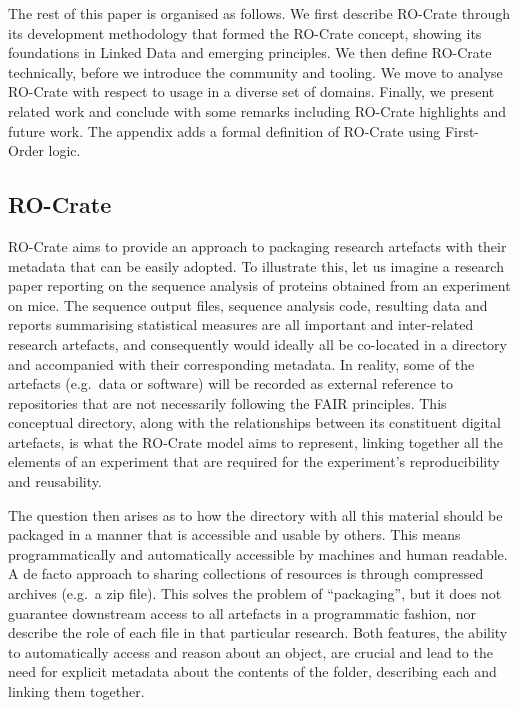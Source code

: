 The rest of this paper is organised as follows. We first describe
RO-Crate through its development methodology that formed the RO-Crate
concept, showing its foundations in Linked Data and emerging principles.
We then define RO-Crate technically, before we introduce the community
and tooling. We move to analyse RO-Crate with respect to usage in a
diverse set of domains. Finally, we present related work and conclude
with some remarks including RO-Crate highlights and future work. The
appendix adds a formal definition of RO-Crate using First-Order logic.

\hypertarget{rocrate}{%
\subsection{RO-Crate}\label{rocrate}}

RO-Crate aims to provide an approach to packaging research artefacts
with their metadata that can be easily adopted. To illustrate this, let
us imagine a research paper reporting on the sequence analysis of
proteins obtained from an experiment on mice. The sequence output files,
sequence analysis code, resulting data and reports summarising
statistical measures are all important and inter-related research
artefacts, and consequently would ideally all be co-located in a
directory and accompanied with their corresponding metadata. In reality,
some of the artefacts (e.g.~data or software) will be recorded as
external reference to repositories that are not necessarily following
the FAIR principles. This conceptual directory, along with the
relationships between its constituent digital artefacts, is what the
RO-Crate model aims to represent, linking together all the elements of
an experiment that are required for the experiment's reproducibility and
reusability.

The question then arises as to how the directory with all this material
should be packaged in a manner that is accessible and usable by others.
This means programmatically and automatically accessible by machines and
human readable. A de facto approach to sharing collections of resources
is through compressed archives (e.g.~a zip file). This solves the
problem of ``packaging'', but it does not guarantee downstream access to
all artefacts in a programmatic fashion, nor describe the role of each
file in that particular research. Both features, the ability to
automatically access and reason about an object, are crucial and lead to
the need for explicit metadata about the contents of the folder,
describing each and linking them together.

